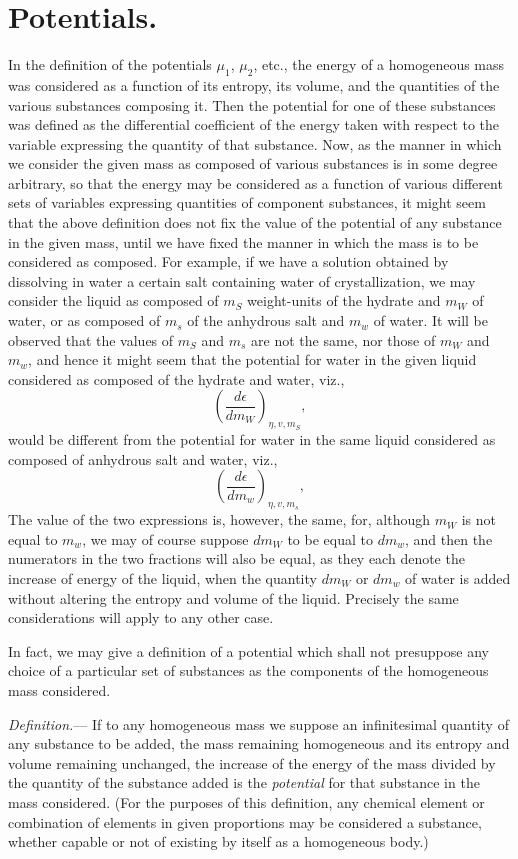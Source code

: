 \documentclass[12pt]{article}
\begin{document}
\section{Potentials.}
In the definition of the potentials $\mu_1$, $\mu_2$, etc., the energy of a homogeneous mass was considered as a function of its entropy, its volume, and the quantities of the various substances composing it. Then the potential for one of these substances was defined as the differential coefficient of the energy taken with respect to the variable expressing the quantity of that substance. Now, as the manner in which we consider the given mass as composed of various substances is in some degree arbitrary, so that the energy may be considered as a function of various different sets of variables expressing quantities of component substances, it might seem that the above definition does not fix the value of the potential of any substance in the given mass, until we have fixed the manner in which the mass is to be considered as composed. For example, if we have a solution obtained by dissolving in water a certain salt containing water of crystallization, we may consider the liquid as composed of $m_S$ weight-units of the hydrate and $m_W$ of water, or as composed of $m_s$ of the anhydrous salt and $m_w$ of water. It will be observed that the values of $m_S$ and
$m_s$ are not the same, nor those of $m_W$ and $m_w$, and hence it might seem that the potential for water in the given liquid considered as composed of the hydrate and water, viz.,
$$\left(\frac{d \epsilon}{dm_W}\right)_{\eta,v,m_S},$$ 
would be different from the potential for water in the same liquid considered as composed of anhydrous salt and water, viz.,
$$\left(\frac{d \epsilon}{dm_w}\right)_{\eta,v,m_s},$$ 
The value of the two expressions is, however, the same, for, although $m_W$ is not equal to $m_w$, we may of course suppose $dm_W$ to be equal to $dm_w$, and then the numerators in the two fractions will also be equal, as they each denote the increase of energy of the liquid, when the quantity $dm_W$ or $dm_w$ of water is added without altering the entropy and volume of the liquid. Precisely the same considerations will apply to any other case.


In fact, we may give a definition of a potential which shall not presuppose any choice of a particular set of substances as the components of the homogeneous mass considered.


\textit{Definition.}--- If to any homogeneous mass we suppose an infinitesimal quantity of any substance to be added, the mass remaining homogeneous and its entropy and volume remaining unchanged, the increase of the energy of the mass divided by the quantity of the substance added is the \textit{potential} for that substance in the mass considered. (For the purposes of this definition, any chemical element or combination of elements in given proportions may be considered a substance, whether capable or not of existing by itself as a homogeneous body.)
\end{document}
